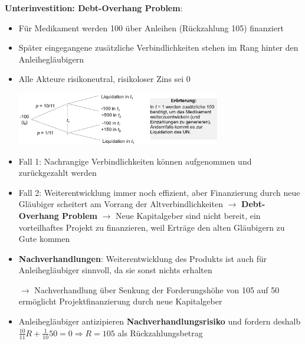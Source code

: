 \textbf{Unterinvestition: Debt-Overhang Problem}:
\begin{itemize}
	\item Für Medikament werden 100 über Anleihen (Rückzahlung 105) finanziert
	\item Später eingegangene zusätzliche Verbindlichkeiten stehen im Rang hinter den Anleihegläubigern
	\item Alle Akteure risikoneutral, risikoloser Zins sei 0
	\begin{center}
		\includegraphics[width=0.7\textwidth]{images/do.png}
	\end{center} 
	\item Fall 1: Nachrangige Verbindlichkeiten können aufgenommen und zurückgezahlt werden
	\item Fall 2: Weiterentwicklung immer noch effizient, aber Finanzierung durch neue Gläubiger scheitert am Vorrang der Altverbindlichkeiten $\rightarrow$ \textbf{Debt-Overhang Problem} $\rightarrow$ Neue Kapitalgeber sind nicht bereit, ein vorteilhaftes Projekt zu finanzieren, weil Erträge den alten Gläubigern zu Gute kommen
	\item \textbf{Nachverhandlungen}: Weiterentwicklung des Produkts ist auch für Anleihegläubiger sinnvoll, da sie sonst nichts erhalten
	
	$\rightarrow$ Nachverhandlung über Senkung der Forderungshöhe von 105 auf 50 ermöglicht Projektfinanzierung durch neue Kapitalgeber
	
	\item Anleihegläubiger antizipieren \textbf{Nachverhandlungsrisiko} und fordern deshalb\\
	 $\frac{10}{11}R+\frac{1}{10}50=0\Rightarrow R=105$ als Rückzahlungsbetrag
\end{itemize}